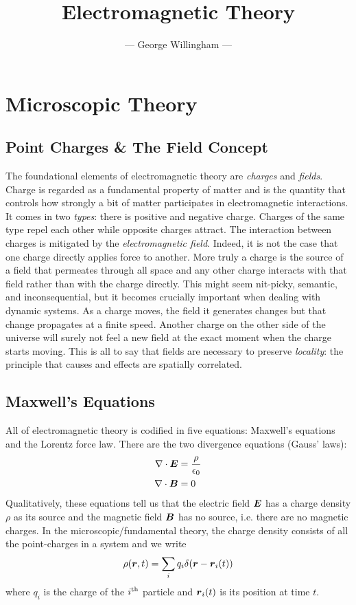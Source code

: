 \documentclass[twocolumn]{gwclass}
\title{Electromagnetic Theory}
\author{--- George Willingham ---}
\date{}
\begin{document}
	\maketitle
	\tableofcontents
	\section{Microscopic Theory}
	\subsection{Point Charges \& The Field Concept}
	The foundational elements of electromagnetic theory are \emph{charges} and \emph{fields}. Charge is regarded as a fundamental property of matter and is the quantity that controls how strongly a bit of matter participates in electromagnetic interactions. It comes in two \emph{types}: there is positive and negative charge. Charges of the same type repel each other while opposite charges attract. The interaction between charges is mitigated by the \emph{electromagnetic field}. Indeed, it is not the case that one charge directly applies force to another. More truly a charge is the source of a field that permeates through all space and any other charge interacts with that field rather than with the charge directly. This might seem nit-picky, semantic, and inconsequential, but it becomes crucially important when dealing with dynamic systems. As a charge moves, the field it generates changes but that change propagates at a finite speed. Another charge on the other side of the universe will surely not feel a new field at the exact moment when the charge starts moving. This is all to say that fields are necessary to preserve \emph{locality}: the principle that causes and effects are spatially correlated.
	\subsection{Maxwell's Equations}
	All of electromagnetic theory is codified in five equations: Maxwell's equations and the Lorentz force law. There are the two divergence equations (Gauss' laws):
	\begin{align*}
		\nabla\cdot \boldsymbol{E} &= \frac{\rho}{\epsilon_0}\\
		\nabla\cdot \boldsymbol{B} &= 0
	\end{align*}
	Qualitatively, these equations tell us that the electric field $\boldsymbol{E}$ has a charge density $\rho$ as its source and the magnetic field $\boldsymbol{B}$ has no source, i.e. there are no magnetic charges. In the microscopic/fundamental theory, the charge density consists of all the point-charges in a system and we write
	$$ \rho(\boldsymbol{r},t) = \sum_i q_i \delta(\boldsymbol{r}-\boldsymbol{r}_i(t)) $$
	where $q_i$ is the charge of the $i^{\text{\normalfont{th}}}$ particle and $\boldsymbol{r}_i(t)$ is its position at time $t$.
	
\end{document}
